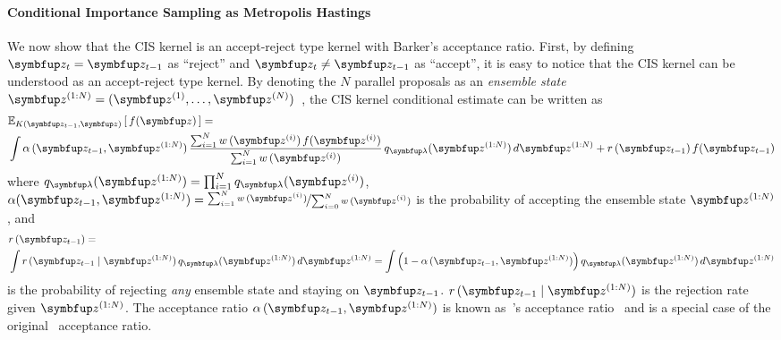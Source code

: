 \paragraph{Conditional Importance Sampling as Metropolis Hastings}
We now show that the CIS kernel is an accept-reject type kernel with Barker's acceptance ratio.
First, by defining \(\vz_t = \vz_{t-1}\) as ``reject'' and \(\vz_t \neq \vz_{t-1}\) as ``accept'', it is easy to notice that the CIS kernel can be understood as an accept-reject type kernel.
By denoting the \(N\) parallel proposals as an \textit{ensemble state} \(\vz^{(1:N)} = (\vz^{(1)}, \ldots, \vz^{(N)})\)~\citep{neal_mcmc_2011a}, the CIS kernel conditional estimate can be written as
\begin{align}
  &\Esub{K(\vz_{t-1}, \vz)}{f(\vz)}  = \nonumber \\  
   &\int \alpha\,(\vz_{t-1}, \vz^{(1:N)}) \,
    \frac{
      \sum^{N}_{i=1} w\,(\vz^{(i)})\,f(\vz^{(i)})
    }
    {
      \sum^{N}_{i=1} w\,(\vz^{(i)})
    } \,
    q_{\vlambda}(\vz^{(1:N)})\,d\vz^{(1:N)}
    + r\,(\vz_{t-1}) \, f(\vz_{t-1})\label{eq:cis_kernel}
\end{align}
where \(q_{\vlambda}(\vz^{(1:N)}) = \prod^N_{i=1} q_{\vlambda}(\vz^{(i)}) \),
\(
  \alpha(\vz_{t-1}, \vz^{(1:N)})
  = \nicefrac{\sum^{N}_{i=1} w\,(\vz^{(i)})}{\sum^{N}_{i=0} w\,(\vz^{(i)})}
\)
is the probability of accepting the ensemble state \(\vz^{(1:N)}\), and
{%
  \begin{align}
    &r\,(\vz_{t-1}) = \nonumber \\ 
    &\int r\,(\vz_{t-1} \mid \vz^{(1:N)})\,q_{\vlambda}(\vz^{(1:N)}) \, d\vz^{(1:N)}
    = \int \left(1 - \alpha\,(\vz_{t-1}, \vz^{(1:N)})\right) q_{\vlambda}(\vz^{(1:N)}) \, d\vz^{(1:N)}
  \end{align}
}%
is the probability of rejecting \textit{any} ensemble state and staying on \(\vz_{t-1}\).
\(r\,(\vz_{t-1}\mid \vz^{(1:N)})\) is the rejection rate given \(\vz^{(1:N)}\).
The acceptance ratio \(\alpha\,(\vz_{t-1}, \vz^{(1:N)})\) is known as~\citeauthor{barker_monte_1965}'s acceptance ratio~\citep{barker_monte_1965} and is a special case of the original~\cite{metropolis_equation_1953} acceptance ratio.


